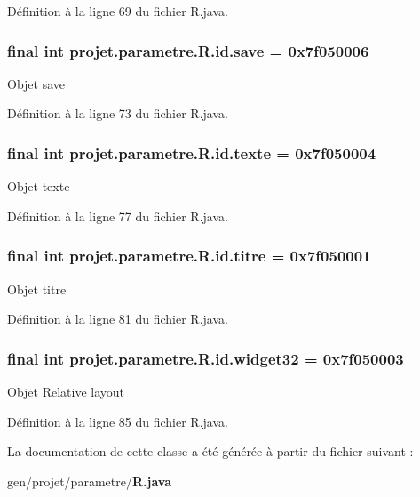 \-Définition à la ligne 69 du fichier \-R.\-java.

\subsubsection[{save}]{\setlength{\rightskip}{0pt plus 5cm}final int {\bf projet.\-parametre.\-R.\-id.\-save} = 0x7f050006\hspace{0.3cm}{\ttfamily  [static]}}\label{classprojet_1_1parametre_1_1_r_1_1id_a1f93d97bfb7ef35015ebb213fcbe8c4e}
\-Objet save 

\-Définition à la ligne 73 du fichier \-R.\-java.

\subsubsection[{texte}]{\setlength{\rightskip}{0pt plus 5cm}final int {\bf projet.\-parametre.\-R.\-id.\-texte} = 0x7f050004\hspace{0.3cm}{\ttfamily  [static]}}\label{classprojet_1_1parametre_1_1_r_1_1id_ae54e29762bedc22c55cdef5b95a9401d}
\-Objet texte 

\-Définition à la ligne 77 du fichier \-R.\-java.

\subsubsection[{titre}]{\setlength{\rightskip}{0pt plus 5cm}final int {\bf projet.\-parametre.\-R.\-id.\-titre} = 0x7f050001\hspace{0.3cm}{\ttfamily  [static]}}\label{classprojet_1_1parametre_1_1_r_1_1id_a963329f1c245df94569190b6e137bd56}
\-Objet titre 

\-Définition à la ligne 81 du fichier \-R.\-java.

\subsubsection[{widget32}]{\setlength{\rightskip}{0pt plus 5cm}final int {\bf projet.\-parametre.\-R.\-id.\-widget32} = 0x7f050003\hspace{0.3cm}{\ttfamily  [static]}}\label{classprojet_1_1parametre_1_1_r_1_1id_aae0602c84582bfb97daf27090ed35045}
\-Objet \-Relative layout 

\-Définition à la ligne 85 du fichier \-R.\-java.



\-La documentation de cette classe a été générée à partir du fichier suivant \-:\begin{DoxyCompactItemize}
\item 
gen/projet/parametre/{\bf \-R.\-java}\end{DoxyCompactItemize}
